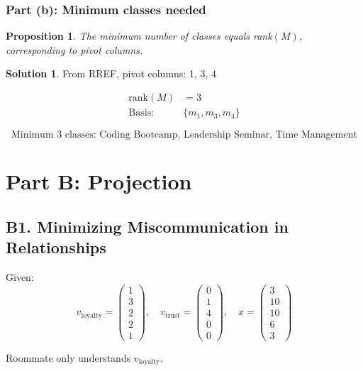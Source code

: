 \documentclass[12pt]{article}
\newtheorem{proposition}{Proposition}
\theoremstyle{definition}
\newtheorem{solution}{Solution}
\begin{document}
\subsubsection*{Part (b): Minimum classes needed}

\begin{proposition}
The minimum number of classes equals rank$(M)$, corresponding to pivot columns.
\end{proposition}

\begin{solution}
From RREF, pivot columns: 1, 3, 4

\begin{align*}
\text{rank}(M) &= 3 \\
\text{Basis: } &\{m_1, m_3, m_4\}
\end{align*}

\[
\boxed{\text{Minimum 3 classes: Coding Bootcamp, Leadership Seminar, Time Management}}
\]
\end{solution}

\newpage
\section*{Part B: Projection}

\subsection*{B1. Minimizing Miscommunication in Relationships}

Given:
\[
v_{\text{loyalty}} = \begin{pmatrix} 1 \\ 3 \\ 2 \\ 2 \\ 1 \end{pmatrix}, \quad
v_{\text{trust}} = \begin{pmatrix} 0 \\ 1 \\ 4 \\ 0 \\ 0 \end{pmatrix}, \quad
x = \begin{pmatrix} 3 \\ 10 \\ 10 \\ 6 \\ 3 \end{pmatrix}
\]

Roommate only understands $v_{\text{loyalty}}$.
\end{document}
